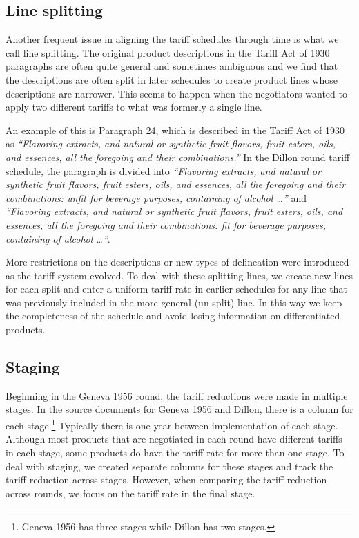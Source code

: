 \documentclass[
  12pt,
]{article}
\begin{document}
\hypertarget{split}{%
\subsection{Line splitting}\label{split}}

Another frequent issue in aligning the tariff schedules through time is what we call line splitting. The original product descriptions in the Tariff Act of 1930 paragraphs are often quite general and sometimes ambiguous and we find that the descriptions are often split in later schedules to create product lines whose descriptions are narrower. This seems to happen when the negotiators wanted to apply two different tariffs to what was formerly a single line.

An example of this is Paragraph 24, which is described in the Tariff Act of 1930 as \emph{``Flavoring extracts, and natural or synthetic fruit flavors, fruit esters, oils, and essences, all the foregoing and their combinations.''} In the Dillon round tariff schedule, the paragraph is divided into \emph{``Flavoring extracts, and natural or synthetic fruit flavors, fruit esters, oils, and essences, all the foregoing and their combinations: unfit for beverage purposes, containing of alcohol \ldots{}''} and \emph{``Flavoring extracts, and natural or synthetic fruit flavors, fruit esters, oils, and essences, all the foregoing and their combinations: fit for beverage purposes, containing of alcohol \ldots{}''}.

More restrictions on the descriptions or new types of delineation were introduced as the tariff system evolved. To deal with these splitting lines, we create new lines for each split and enter a uniform tariff rate in earlier schedules for any line that was previously included in the more general (un-split) line. In this way we keep the completeness of the schedule and avoid losing information on differentiated products.

\hypertarget{staging}{%
\subsection{Staging}\label{staging}}

Beginning in the Geneva 1956 round, the tariff reductions were made in multiple stages. In the source documents for Geneva 1956 and Dillon, there is a column for each stage.\footnote{Geneva 1956 has three stages while Dillon has two stages.} Typically there is one year between implementation of each stage. Although most products that are negotiated in each round have different tariffs in each stage, some products do have the tariff rate for more than one stage. To deal with staging, we created separate columns for these stages and track the tariff reduction across stages. However, when comparing the tariff reduction across rounds, we focus on the tariff rate in the final stage.
\end{document}
